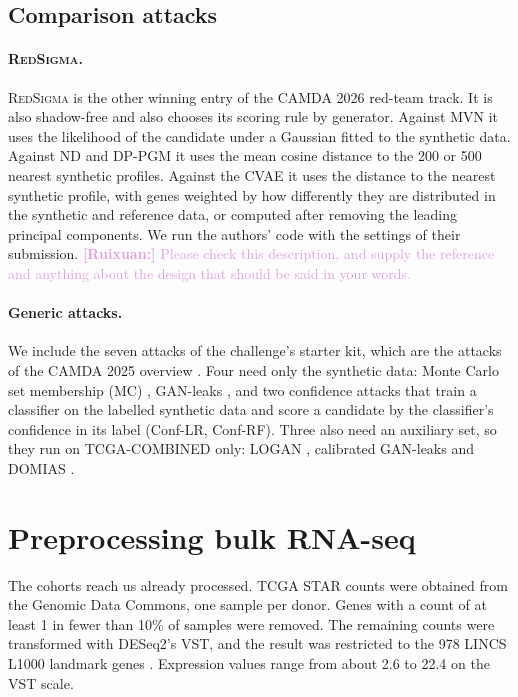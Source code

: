 \documentclass[webpdf,contemporary,large]{oup-authoring-template}
\newif\ifdraft \drafttrue
\newcommand{\annot}[3]{\ifdraft\textcolor{#1}{\textbf{[#2:]} #3}\fi}
\newcommand{\ruixuan}[1]{\annot{Plum}{Ruixuan}{#1}}
\newcommand{\redsigma}{\textsc{RedSigma}}
\begin{document}
\subsection{Comparison attacks}
\label{sec:baselines}

\paragraph{\redsigma{}.}
\redsigma{} \citep{tucker2026redsigma} is the other winning entry of the CAMDA 2026 red-team track. It is also shadow-free and also chooses its scoring rule by generator. Against MVN it uses the likelihood of the candidate under a Gaussian fitted to the synthetic data. Against ND and DP-PGM it uses the mean cosine distance to the 200 or 500 nearest synthetic profiles. Against the CVAE it uses the distance to the nearest synthetic profile, with genes weighted by how differently they are distributed in the synthetic and reference data, or computed after removing the leading principal components. We run the authors' code with the settings of their submission.
\ruixuan{Please check this description, and supply the reference and anything about the design that should be said in your words.}

\paragraph{Generic attacks.}
We include the seven attacks of the challenge's starter kit, which are the attacks of the CAMDA 2025 overview \citep{ozturk2026towards}. Four need only the synthetic data: Monte Carlo set membership (MC) \citep{hilprecht2019monte}, GAN-leaks \citep{chen2020gan}, and two confidence attacks that train a classifier on the labelled synthetic data and score a candidate by the classifier's confidence in its label (Conf-LR, Conf-RF). Three also need an auxiliary set, so they run on TCGA-COMBINED only: LOGAN \citep{hayes2017logan}, calibrated GAN-leaks \citep{chen2020gan} and DOMIAS \citep{van2023membership}.

\section{Preprocessing bulk RNA-seq}
\label{sec:preprocessing}

The cohorts reach us already processed. TCGA STAR counts were obtained from the Genomic Data Commons, one sample per donor. Genes with a count of at least 1 in fewer than 10\% of samples were removed. The remaining counts were transformed with DESeq2's VST, and the result was restricted to the 978 LINCS L1000 landmark genes \citep{ozturk2026towards}. Expression values range from about 2.6 to 22.4 on the VST scale.
\end{document}
